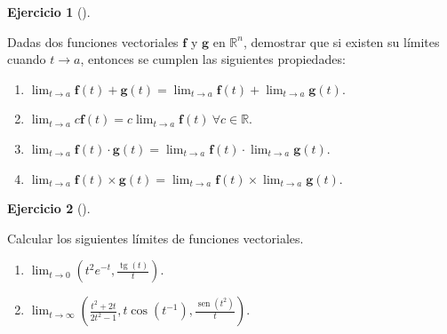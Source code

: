 \documentclass[
  spanish,
  a4paper,
]{scrreport}
\theoremstyle{definition}
\newtheorem{exercise}{Ejercicio}[chapter]
\theoremstyle{remark}
\begin{document}
\begin{exercise}[]\protect\hypertarget{exr-algebra-limites-funciones-vectoriales}{}\label{exr-algebra-limites-funciones-vectoriales}

Dadas dos funciones vectoriales \(\mathbf{f}\) y \(\mathbf{g}\) en
\(\mathbb{R}^n\), demostrar que si existen su límites cuando \(t\to a\),
entonces se cumplen las siguientes propiedades:

\begin{enumerate}
\def\labelenumi{\alph{enumi}.}
\item
  \(\displaystyle \lim_{t\to a} \mathbf{f}(t) + \mathbf{g}(t) = \lim_{t\to a} \mathbf{f}(t) + \lim_{t\to a} \mathbf{g}(t)\).
\item
  \(\displaystyle \lim_{t\to a} c\mathbf{f}(t) = c\lim_{t\to a} \mathbf{f}(t)\ \forall c\in\mathbb{R}\).
\item
  \(\displaystyle \lim_{t\to a} \mathbf{f}(t)\cdot \mathbf{g}(t) = \lim_{t\to a} \mathbf{f}(t) \cdot \lim_{t\to a} \mathbf{g}(t)\).
\item
  \(\displaystyle \lim_{t\to a} \mathbf{f}(t) \times \mathbf{g}(t) = \lim_{t\to a} \mathbf{f}(t) \times \lim_{t\to a} \mathbf{g}(t)\).
\end{enumerate}

\end{exercise}

\begin{tcolorbox}[enhanced jigsaw, arc=.35mm, bottomrule=.15mm, bottomtitle=1mm, breakable, colback=white, colbacktitle=quarto-callout-tip-color!10!white, colframe=quarto-callout-tip-color-frame, coltitle=black, left=2mm, leftrule=.75mm, opacityback=0, opacitybacktitle=0.6, rightrule=.15mm, title=\textcolor{quarto-callout-tip-color}{\faLightbulb}\hspace{0.5em}{Solución}, titlerule=0mm, toprule=.15mm, toptitle=1mm]

\end{tcolorbox}

\begin{exercise}[]\protect\hypertarget{exr-limites-funciones-vectoriales}{}\label{exr-limites-funciones-vectoriales}

Calcular los siguientes límites de funciones vectoriales.

\begin{enumerate}
\def\labelenumi{\alph{enumi}.}
\item
  \(\displaystyle \lim_{t\to 0} \left(t^2e^{-t}, \frac{\operatorname{tg}(t)}{t} \right)\).
\item
  \(\displaystyle \lim_{t\to \infty} \left(\frac{t^2+2t}{2t^2-1}, t\cos(t^{-1}), \frac{\operatorname{sen}(t^2)}{t} \right)\).
\end{enumerate}

\end{exercise}
\end{document}
